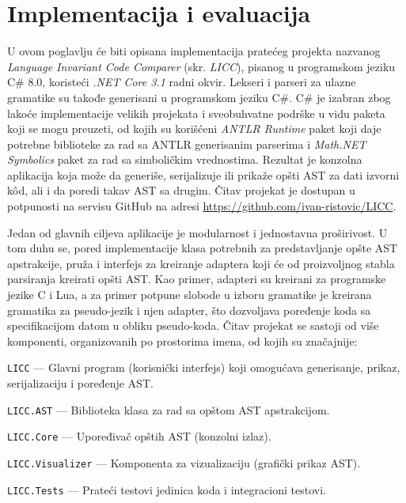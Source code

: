 \chapter{Implementacija i evaluacija}
\label{chp:Implementation}

U ovom poglavlju će biti opisana implementacija pratećeg projekta nazvanog \emph{Language Invariant Code Comparer} (skr. \emph{LICC}), pisanog u programskom jeziku C\# 8.0, koristeći \emph{.NET Core 3.1} radni okvir. Lekseri i parseri za ulazne gramatike su takođe generisani u programskom jeziku C\#. C\# je izabran zbog lakoće implementacije velikih projekata i sveobuhvatne podrške u vidu paketa koji se mogu preuzeti, od kojih su korišćeni \emph{ANTLR Runtime} paket koji daje potrebne biblioteke za rad sa ANTLR generisanim parserima i \emph{Math.NET Symbolics} paket za rad sa simboličkim vrednostima. Rezultat je konzolna aplikacija koja može da generiše, serijalizuje ili prikaže opšti AST za dati izvorni k\^od, ali i da poredi takav AST sa drugim. Čitav projekat je dostupan u potpunosti na servisu GitHub na adresi \url{https://github.com/ivan-ristovic/LICC}.

Jedan od glavnih ciljeva aplikacije je modularnost i jednostavna proširivost. U tom duhu se, pored implementacije klasa potrebnih za predstavljanje opšte AST apstrakcije, pruža i interfejs za kreiranje adaptera koji će od proizvoljnog stabla parsiranja kreirati opšti AST. Kao primer, adapteri su kreirani za programske jezike C i Lua, a za primer potpune slobode u izboru gramatike je kreirana gramatika za pseudo-jezik i njen adapter, što dozvoljava poređenje koda sa specifikacijom datom u obliku pseudo-koda. Čitav projekat se sastoji od više komponenti, organizovanih po prostorima imena, od kojih su značajnije:
\begin{description}
    \item \texttt{LICC} --- Glavni program (korisnički interfejs) koji omogućava generisanje, prikaz, serijalizaciju i poređenje AST.
    \item \texttt{LICC.AST} --- Biblioteka klasa za rad sa opštom AST apstrakcijom.
    \item \texttt{LICC.Core} --- Upoređivač opštih AST (konzolni izlaz).
    \item \texttt{LICC.Visualizer} --- Komponenta za vizualizaciju (grafički prikaz AST).
    \item \texttt{LICC.Tests} --- Prateći testovi jedinica koda i integracioni testovi.
\end{description}

